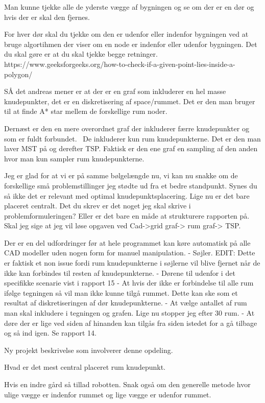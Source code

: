 Man kunne tjekke alle de yderste vægge af bygningen og se om der er en dør og hvis der er skal den fjernes.

For hver dør skal du tjekke om den er udenfor eller indenfor bygningen ved at bruge algortihmen der viser om en node er indenfor eller udenfor bygningen. Det du skal gøre er at du skal tjekke begge retninger. 
https://www.geeksforgeeks.org/how-to-check-if-a-given-point-lies-inside-a-polygon/


SÅ det andreas mener er at der er en graf som inkluderer en hel masse knudepunkter, det er en diskretisering af space/rummet. Det er den man bruger til at finde A* star mellem de forskellige rum noder. 

Dernæst er den en mere overordnet graf der inkluderer færre knudepunkter og som er fuldt forbundet.  De inkluderer kun rum knudepunkterne. Det er den man laver MST på og derefter TSP.
Faktisk er den ene graf en sampling af den anden hvor man kun sampler rum knudepunkterne.

Jeg er glad for at vi er på samme bølgelængde nu, vi kan nu snakke om de forskellige små problemstillinger jeg stødte ud fra et bedre standpunkt.
Synes du så ikke det er relevant med optimal knudepunktsplacering. Lige nu er det bare placeret centralt.
Det du skrev er det noget jeg skal skrive i problemformuleringen? Eller er det bare en måde at strukturere rapporten på. Skal jeg sige at jeg vil løse opgaven ved Cad->grid graf-> rum graf-> TSP.



Der er en del udfordringer før at hele programmet kan køre automatisk på alle CAD modeller uden nogen form for manuel manipulation.
- Søjler. EDIT: Dette er faktisk et non issue fordi rum knudepunkterne i søjlerne vil blive fjernet når de ikke kan forbindes til resten af knudepunkterne.
- Dørene til udenfor i det specifikke scenarie vist i rapport 15
- At hvis der ikke er forbindelse til alle rum ifølge tegningen så vil man ikke kunne tilgå rummet. Dette kan ske som et resultat af diskretiseringen af dør knudepunkterne.
- At vælge antallet af rum man skal inkludere i tegningen og grafen. Lige nu stopper jeg efter 30 rum.
- At døre der er lige ved siden af hinanden kan tilgås fra siden istedet for a gå tilbage og så ind igen. Se rapport 14.

Ny projekt beskrivelse som involverer denne opdeling.

Hvad er det mest central placeret rum knudepunkt.

Hvis en indre gård så tillad robotten. Snak også om den generelle metode hvor ulige vægge er indenfor rummet og lige vægge er udenfor rummet.

